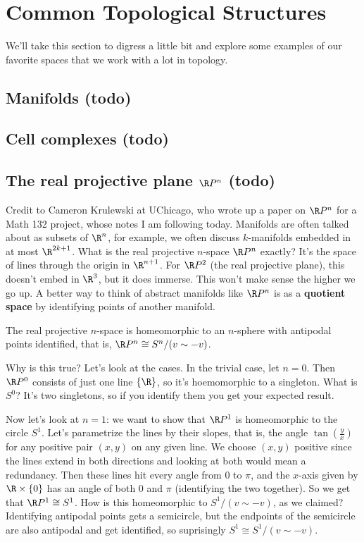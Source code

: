 \section{Common Topological Structures}
We'll take this section to digress a little bit and explore some examples of our favorite spaces that we work with a lot in topology.
\subsection{Manifolds (todo)}
\subsection{Cell complexes (todo)}
\subsection{The real projective plane $\R P^n$ (todo)}
Credit to Cameron Krulewski at UChicago, who wrote up a paper on $\R P^n$ for a Math 132 project, whose notes I am following today.
\orbreak
Manifolds are often talked about as subsets of $\R^n$, for example, we often discuss $k$-manifolds embedded in at most $\R^{2k+1}$. What is the real projective $n$-space $\R P^n$ exactly? It's the space of lines through the origin in $\R^{n+1}$. For $\R P^2$ (the real projective plane), this doesn't embed in $\R^3$, but it does immerse. This won't make sense the higher we go up. A better way to think of abstract manifolds like $\R P^n$ is as a \textbf{quotient space} by identifying points of another manifold.
\begin{claim}
    The real projective $n$-space is homeomorphic to an $n$-sphere with antipodal points identified, that is, $\R P^n \cong S^n/ (v \sim -v)$.
\end{claim}
Why is this true? Let's look at the cases. In the trivial case, let $n=0$. Then $\R P^0$ consists of just one line $\{\R\} $, so it's hoemomorphic to a singleton. What is $S^0$? It's two singletons, so if you identify them you get your expected result.

Now let's look at $n=1$: we want to show that $\R P^1$ is homeomorphic to the circle $S^{1} $. Let's parametrize the lines by their slopes, that is, the angle $\tan \left( \frac{y}{x} \right) $ for any positive pair $(x,y)$ on any given line. We choose $(x,y)$ positive since the lines extend in both directions and looking at both would mean a redundancy. Then these lines hit every angle from $0$ to $\pi$, and the $x$-axis given by $\R\times \{0\} $ has an angle of both $0$ and $\pi$ (identifying the two together). So we get that $\R P^1 \cong S^{1} $. How is this homeomorphic to $S^{1} / (v \sim -v)$, as we claimed? Identifying antipodal points gets a semicircle, but the endpoints of the semicircle are also antipodal and get identified, so suprisingly $S^{1} \cong S^{1} /(v\sim -v)$.






